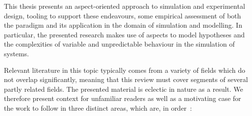 %
%



This thesis presents an aspect-oriented approach to simulation and experimental
design, tooling to support these endeavours, some empirical assessment of both
the paradigm and its application in the domain of simulation and modelling. In
particular, the presented research makes use of aspects to model hypotheses and
the complexities of variable and unpredictable behaviour in the simulation of
\sociotechnical systems.

Relevant literature in this topic typically comes from a variety of fields which
do not overlap significantly, meaning that this review must cover segments of
several partly related fields. The presented material is eclectic in nature as a
result. We therefore present context for unfamiliar readers as well as a
motivating case for the work to follow in three distinct areas, which are, in
order~:

